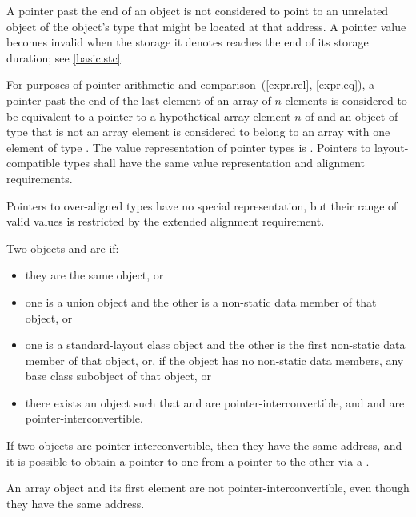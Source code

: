 \begin{note}
A pointer past the end of an object
is not considered to point to an unrelated object
of the object's type
that might be located at that address.
A pointer value becomes invalid
when the storage it denotes
reaches the end of its storage duration;
see \ref{basic.stc}.
\end{note}
For purposes of pointer arithmetic
and comparison~(\ref{expr.rel}, \ref{expr.eq}),
a pointer past the end of the last element of
an array  of $n$ elements
is considered to be equivalent to
a pointer to a hypothetical array element $n$ of  and
an object of type  that is not an array element
is considered to belong to an array with one element of type .
The value representation of
pointer types is . Pointers to
layout-compatible types shall
have the same value representation and alignment
requirements.
\begin{note}
Pointers to over-aligned types have no special
representation, but their range of valid values is restricted by the extended
alignment requirement.
\end{note}

\pnum
Two objects  and  are  if:
\begin{itemize}
\item
they are the same object, or
\item
one is a union object and
the other is a non-static data member of that object, or
\item
one is a standard-layout class object and
the other is the first non-static data member of that object, or,
if the object has no non-static data members,
any base class subobject of that object, or
\item
there exists an object  such that
 and  are pointer-interconvertible, and
 and  are pointer-interconvertible.
\end{itemize}
If two objects are pointer-interconvertible,
then they have the same address,
and it is possible to obtain a pointer to one
from a pointer to the other
via a .
\begin{note}
An array object and its first element are not pointer-interconvertible,
even though they have the same address.
\end{note}

